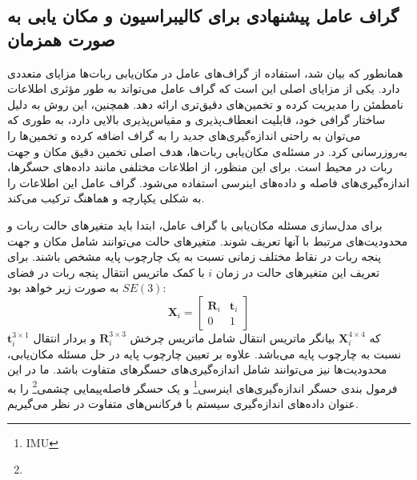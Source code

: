 \subsection{گراف عامل پیشنهادی برای کالیبراسیون و مکان یابی به صورت همزمان}
  
همانطور که بیان شد، استفاده از گراف‌های عامل در مکان‌یابی ربات‌ها مزایای متعددی دارد. یکی از مزایای اصلی این است که گراف عامل می‌تواند به طور مؤثری اطلاعات نامطمئن را مدیریت کرده و تخمین‌های دقیق‌تری ارائه دهد. همچنین، این روش به دلیل ساختار گرافی خود، قابلیت انعطاف‌پذیری و مقیاس‌پذیری بالایی دارد، به طوری که می‌توان به راحتی اندازه‌گیری‌های جدید را به گراف اضافه کرده و تخمین‌ها را به‌روزرسانی کرد. در مسئله‌ی مکان‌یابی ربات‌ها، هدف اصلی تخمین دقیق مکان و جهت ربات در محیط است. برای این منظور، از اطلاعات مختلفی مانند داده‌های حسگرها، اندازه‌گیری‌های فاصله و داده‌های اینرسی استفاده می‌شود. گراف عامل این اطلاعات را به شکلی یکپارچه و هماهنگ ترکیب می‌کند.

برای مدل‌سازی مسئله مکان‌یابی با گراف عامل، ابتدا باید متغیرهای حالت ربات و محدودیت‌های مرتبط با آنها تعریف شوند. متغیرهای حالت می‌توانند شامل مکان و جهت پنجه ربات در نقاط مختلف زمانی نسبت به یک چارچوب پایه مشخص باشند. برای تعریف این متغیرهای حالت در زمان $i$ با کمک ماتریس انتقال پنجه ربات در فضای
$SE(3)$
به صورت زیر خواهد بود:
\begin{equation} \label{eq:transformation matrix}
	\boldsymbol{X}_i = \begin{bmatrix}
							\mathbf{R}_i & \mathbf{t}_i \\
								0 & 1
				     	\end{bmatrix}
\end{equation}
که 
$\boldsymbol{X}_i^{4\times4}$
 بیانگر ماتریس انتقال شامل ماتریس چرخش 
$\mathbf{R}_i^{3\times3}$
 و بردار انتقال 
 $ \mathbf{t}_i^{3\times1}$ 
 نسبت به چارچوب پایه می‌باشد. علاوه بر تعیین چارچوب پایه در حل مسئله مکان‌یابی، محدودیت‌ها نیز می‌توانند
شامل اندازه‌گیری‌های حسگرهای متفاوت باشد. 
 ما در این فرمول بندی
 حسگر اندازه‌گیری‌های اینرسی\footnote{IMU} 
 و یک حسگر فاصله‌پیمایی چشمی\footnote{}
را به عنوان داده‌های اندازه‌گیری سیستم با فرکانس‌های متفاوت در نظر می‌گیریم. 


